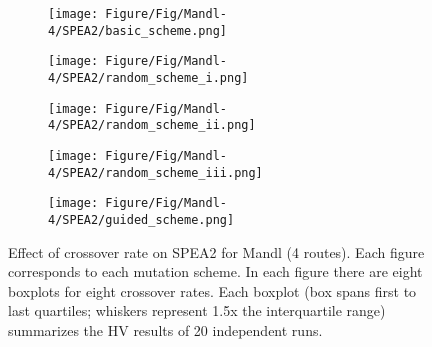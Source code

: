 \begin{figure}[!htbp]
	\centering
	\begin{subfigure}[b]{0.52\textwidth}
		\texttt{[image: Figure/Fig/Mandl-4/SPEA2/basic\_scheme.png]}
	\end{subfigure}%
	\begin{subfigure}[b]{0.52\textwidth}
		\texttt{[image: Figure/Fig/Mandl-4/SPEA2/random\_scheme\_i.png]}
	\end{subfigure}%
	\newline
	\begin{subfigure}[b]{0.52\textwidth}
		\texttt{[image: Figure/Fig/Mandl-4/SPEA2/random\_scheme\_ii.png]}
	\end{subfigure}%
	\begin{subfigure}[b]{0.52\textwidth}
		\texttt{[image: Figure/Fig/Mandl-4/SPEA2/random\_scheme\_iii.png]}
	\end{subfigure}%
	\newline
	\begin{subfigure}[b]{0.52\textwidth}
		\texttt{[image: Figure/Fig/Mandl-4/SPEA2/guided\_scheme.png]}
	\end{subfigure}%
	\caption{Effect of crossover rate on SPEA2 for Mandl (4 routes). Each figure corresponds to each mutation scheme. In each figure there are eight boxplots for eight crossover rates.  Each boxplot (box spans first to last quartiles; whiskers represent 1.5x the interquartile range) summarizes the HV results of 20 independent runs.}
	\label{fig:cr_mandl4_spea2}
\end{figure}
